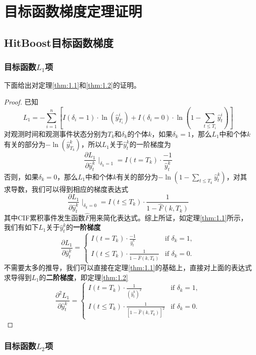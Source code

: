
\thesisappendix

\chapter{目标函数梯度定理证明}

\section{HitBoost目标函数梯度}

\subsection{目标函数$L_1$项}

下面给出对定理\ref{thm:1.1}和\ref{thm:1.2}的证明。
\begin{proof}
已知$$L_1 = -\sum_{i=1}^{n} \left[ I(\delta_i=1)\cdot \ln(\hat{y}_{T_i}^i) + I(\delta_i=0)\cdot \ln(1-\sum_{t\le T_i}\hat{y}_t^i) \right]$$ 对观测时间和观测事件状态分别为$T_k$和$\delta_k$的个体$k$，如果$\delta_k = 1$，那么$L_1$中和个体$k$有关的部分为$-\ln(\hat{y}_{T_k}^k)$，所以$L_1$关于$\hat{y}_t^k$的一阶梯度为$$\frac{\partial L_1}{\partial \hat{y}_t^k} \mid_{\delta_k = 1} = I(t=T_k)\cdot \frac{-1}{\hat{y}_t^k}$$ 否则，如果$\delta_k = 0$，那么$L_1$中和个体$k$有关的部分为$-\ln(1-\sum_{t\le T_k}\hat{y}_t^k)$，对其求导数，我们可以得到相应的梯度表达式$$\frac{\partial L_1}{\partial \hat{y}_t^k} \mid_{\delta_k = 0} = I(t\le T_k)\cdot \frac{1}{1-\hat{F}(k, T_k)}$$ 其中CIF累积事件发生函数$\hat{F}$用来简化表达式。综上所证，如定理\ref{thm:1.1}所示，我们有如下$L_1$关于$\hat{y}_t^k$的\textbf{一阶梯度}$$
\frac{\partial L_1}{\partial \hat{y}_t^k}=
\begin{cases}
  I(t=T_k)\cdot \frac{-1}{\hat{y}_t^k} & \text{if } \delta_k = 1,\\
  I(t\le T_k)\cdot \frac{1}{1-\hat{F}(k, T_k)} & \text{if } \delta_k = 0.
\end{cases}
$$ 不需要太多的推导，我们可以直接在定理\ref{thm:1.1}的基础上，直接对上面的表达式求导得到$L_1$的\textbf{二阶梯度}，即定理\ref{thm:1.2}$$
\frac{\partial^2 L_1}{\partial \hat{y}_t^k}=
\begin{cases}
  I(t=T_k)\cdot \frac{1}{{(\hat{y}_t^k)}^2} & \text{if } \delta_k = 1,\\
  I(t\le T_k)\cdot \frac{1}{{[1-\hat{F}(k, T_k)]}^2} & \text{if } \delta_k = 0.
\end{cases}
$$
\end{proof}

\subsection{目标函数$L_2$项}

